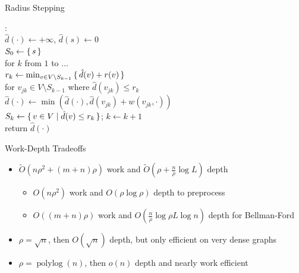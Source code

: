 \documentclass[aspectratio=169]{beamer}
\newcommand{\pauseitem}{\onslide<+-> \item}
\begin{document}
\begin{frame}{Radius Stepping}
    \begin{algo}
        : \+
        \\ $\hat{d}(\cdot) \gets  + \infty$, $\hat{d}(s) \gets 0$
        \\ $S_0 \gets \set{s}$
        \\ for $k$ from $1$ to $\ldots$
        \+ \\ $r_k \gets \min_{v \in V \setminus S_{k-1}} \set{\hat{d}(v) + r(v)}$ \-
        \+ \\ for $v_{jk} \in V \setminus S_{k-1}$ where $\hat{d}(v_{jk}) \le r_k$ \-
        \+ \+ \\ $\hat{d}(\cdot) \gets \min( \hat{d}(\cdot), \hat{d}(v_{jk}) + w(v_{jk}, \cdot) ) $ \- \-
        \\ \+ $S_k \gets \set{ v \in V \mid \hat{d}(v) \le r_k }$; $k \gets k + 1$ \-
        \\ return $\hat{d}(\cdot)$
    \end{algo}
\end{frame}

\begin{frame}{Work-Depth Tradeoffs}
    \begin{itemize}
        \pauseitem $\tilde{O}(n \rho^2 + (m + n) \rho)$ work and $\tilde{O}(\rho + \frac{n}{\rho} \log L)$ depth
        \begin{itemize}
            \pauseitem $O(n \rho^2)$ work and $O(\rho \log \rho)$ depth to preprocess
            \pauseitem $O((m + n) \rho)$ work and $O(\frac{n}{\rho} \log \rho L \log n)$ depth for Bellman-Ford
        \end{itemize}
        \pauseitem $\rho = \sqrt{n}$, then $O(\sqrt{n})$ depth, but only efficient on very dense graphs
        \pauseitem $\rho = \operatorname{polylog}(n)$, then $o(n)$ depth and nearly work efficient
    \end{itemize}
\end{frame}
\end{document}
